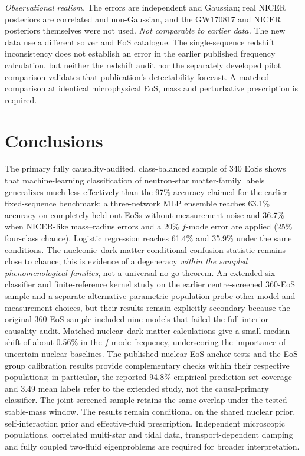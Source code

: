 \documentclass[11pt,a4paper]{article}
\begin{document}
\emph{Observational realism.} The errors are independent and Gaussian; real NICER posteriors are correlated and non-Gaussian, and the GW170817 and NICER posteriors themselves were not used.
\emph{Not comparable to earlier data.} The new data use a different solver and EoS catalogue. The single-sequence redshift inconsistency does not establish an error in the earlier published frequency calculation, but neither the redshift audit nor the separately developed pilot comparison validates that publication's detectability forecast. A matched comparison at identical microphysical EoS, mass and perturbative prescription is required.

\section{Conclusions}
The primary fully causality-audited, class-balanced sample of 340 EoSs shows that machine-learning classification of neutron-star matter-family labels generalizes much less effectively than the 97\% accuracy claimed for the earlier fixed-sequence benchmark: a three-network MLP ensemble reaches 63.1\% accuracy on completely held-out EoSs without measurement noise and 36.7\% when NICER-like mass--radius errors and a 20\% $f$-mode error are applied (25\% four-class chance). Logistic regression reaches 61.4\% and 35.9\% under the same conditions. The nucleonic--dark-matter conditional confusion statistic remains close to chance; this is evidence of a degeneracy \emph{within the sampled phenomenological families}, not a universal no-go theorem. An extended six-classifier and finite-reference kernel study on the earlier centre-screened 360-EoS sample and a separate alternative parametric population probe other model and measurement choices, but their results remain explicitly secondary because the original 360-EoS sample included nine models that failed the full-interior causality audit. Matched nuclear--dark-matter calculations give a small median shift of about 0.56\% in the $f$-mode frequency, underscoring the importance of uncertain nuclear baselines. The published nuclear-EoS anchor tests and the EoS-group calibration results provide complementary checks within their respective populations; in particular, the reported 94.8\% empirical prediction-set coverage and 3.49 mean labels refer to the extended study, not the causal-primary classifier. The joint-screened sample retains the same overlap under the tested stable-mass window. The results remain conditional on the shared nuclear prior, self-interaction prior and effective-fluid prescription. Independent microscopic populations, correlated multi-star and tidal data, transport-dependent damping and fully coupled two-fluid eigenproblems are required for broader interpretation.
\end{document}
